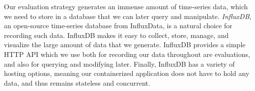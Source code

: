 Our evaluation strategy generates an immense amount of time-series data, which
we need to store in a database that we can later query and manipulate.
\textit{InfluxDB}, an open-source time-series database from InfluxData, is a
natural choice for recording such data. InfluxDB makes it easy to collect,
store, manage, and visualize the large amount of data that we generate.
InfluxDB provides a simple HTTP API which we use both for recording our data
throughout are evaluations, and also for querying and modifying later.
Finally, InfluxDB has a variety of hosting options, meaning our containerized application
does not have to hold any data, and thus remains stateless and concurrent.
